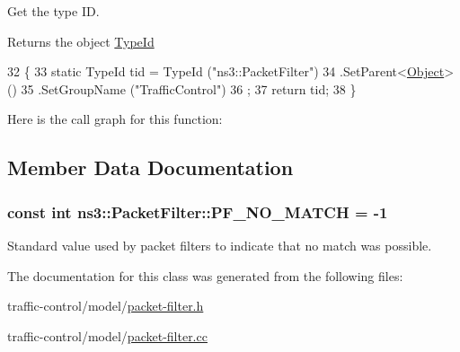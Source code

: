 Get the type ID. 

\begin{DoxyReturn}{Returns}
the object \hyperlink{classns3_1_1TypeId}{Type\+Id} 
\end{DoxyReturn}

\begin{DoxyCode}
32 \{
33   \textcolor{keyword}{static} TypeId tid = TypeId (\textcolor{stringliteral}{"ns3::PacketFilter"})
34     .SetParent<\hyperlink{classns3_1_1Object_a40860402e64d8008fb42329df7097cdb}{Object}> ()
35     .SetGroupName (\textcolor{stringliteral}{"TrafficControl"})
36   ;
37   \textcolor{keywordflow}{return} tid;
38 \}
\end{DoxyCode}


Here is the call graph for this function\+:




\subsection{Member Data Documentation}
\subsubsection[{\texorpdfstring{P\+F\+\_\+\+N\+O\+\_\+\+M\+A\+T\+CH}{PF_NO_MATCH}}]{\setlength{\rightskip}{0pt plus 5cm}const int ns3\+::\+Packet\+Filter\+::\+P\+F\+\_\+\+N\+O\+\_\+\+M\+A\+T\+CH = -\/1\hspace{0.3cm}{\ttfamily [static]}}\hypertarget{classns3_1_1PacketFilter_a5395721034f6c71a021436b928a0cd95}{}\label{classns3_1_1PacketFilter_a5395721034f6c71a021436b928a0cd95}
Standard value used by packet filters to indicate that no match was possible. 

The documentation for this class was generated from the following files\+:\begin{DoxyCompactItemize}
\item 
traffic-\/control/model/\hyperlink{packet-filter_8h}{packet-\/filter.\+h}\item 
traffic-\/control/model/\hyperlink{packet-filter_8cc}{packet-\/filter.\+cc}\end{DoxyCompactItemize}
